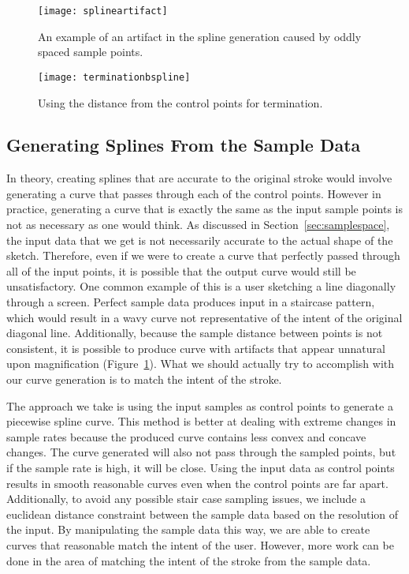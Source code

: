 \begin{center}
\begin{figure}
\begin{center}
\texttt{[image: splineartifact]}
\end{center}
\caption{An example of an artifact in the spline generation caused by oddly spaced sample points.}
\label{fig:splineartifact}
\end{figure}
\begin{figure}
\begin{center}
\texttt{[image: terminationbspline]}
\end{center}
\caption{Using the distance from the control points for termination.}
\end{figure}
\end{center}

\subsection{Generating Splines From the Sample Data}
In theory, creating splines that are accurate to the original stroke would involve generating a curve that passes through each of the control points.
However in practice, generating a curve that is exactly the same as the input sample points is not as necessary as one would think. 
As discussed in Section~\ref{sec:samplespace}, the input data that we get is not necessarily accurate to the actual shape of the sketch.
Therefore, even if we were to create a curve that perfectly passed through all of the input points, it is possible that the output curve would still be unsatisfactory.
One common example of this is a user sketching a line diagonally through a screen.
Perfect sample data produces input in a staircase pattern, which would result in a wavy curve not representative of the intent of the original diagonal line.
Additionally, because the sample distance between points is not consistent, it is possible to produce curve with artifacts that appear unnatural upon magnification (Figure~\ref{fig:splineartifact}).
What we should actually try to accomplish with our curve generation is to match the intent of the stroke.


The approach we take is using the input samples as control points to generate a piecewise spline curve. 
This method is better at dealing with extreme changes in sample rates because the produced curve contains less convex and concave changes. 
The curve generated will also not pass through the sampled points, but if the sample rate is high, it will be close.
Using the input data as control points results in smooth reasonable curves even when the control points are far apart.
Additionally, to avoid any possible stair case sampling issues, we include a euclidean distance constraint between the sample data based on the resolution of the input. 
By manipulating the sample data this way, we are able to create curves that reasonable match the intent of the user.
However, more work can be done in the area of matching the intent of the stroke from the sample data. 

